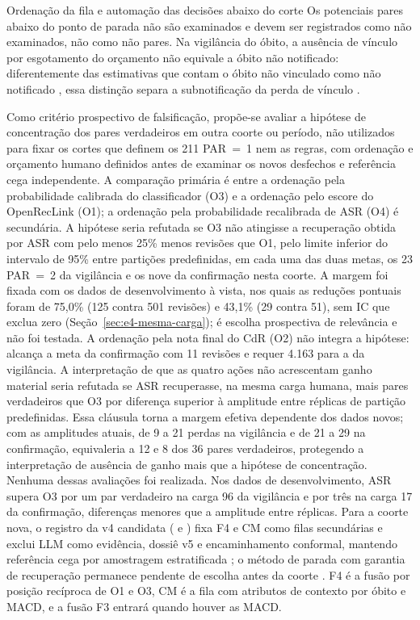 \begin{chapter}{Ordenação da fila e automação das decisões abaixo do corte}
Os potenciais pares abaixo do ponto de parada não são examinados e devem ser registrados como não examinados, não como não pares. Na vigilância do óbito, a ausência de vínculo por esgotamento do orçamento não equivale a óbito não notificado: diferentemente das estimativas que contam o óbito não vinculado como não notificado \cite{Oliveira2012uso,Pinheiro2012subnotificacao}, essa distinção separa a subnotificação da perda de vínculo \cite{Doidge2019linkageerror}.

Como critério prospectivo de falsificação, propõe-se avaliar a hipótese de concentração dos pares verdadeiros em outra coorte ou período, não utilizados para fixar os cortes que definem os 211 PAR~=~1 nem as regras, com ordenação e orçamento humano definidos antes de examinar os novos desfechos e referência cega independente. A comparação primária é entre a ordenação pela probabilidade calibrada do classificador (O3) e a ordenação pelo escore do OpenRecLink (O1); a ordenação pela probabilidade recalibrada de ASR (O4) é secundária. A hipótese seria refutada se O3 não atingisse a recuperação obtida por ASR com pelo menos 25\% menos revisões que O1, pelo limite inferior do intervalo de 95\% entre partições predefinidas, em cada uma das duas metas, os 23 PAR~=~2 da vigilância e os nove da confirmação nesta coorte. A margem foi fixada com os dados de desenvolvimento à vista, nos quais as reduções pontuais foram de 75,0\% (125 contra 501 revisões) e 43,1\% (29 contra 51), sem IC que exclua zero (Seção~\ref{sec:e4-mesma-carga}); é escolha prospectiva de relevância e não foi testada. A ordenação pela nota final do CdR (O2) não integra a hipótese: alcança a meta da confirmação com 11 revisões e requer 4.163 para a da vigilância. A interpretação de que as quatro ações não acrescentam ganho material seria refutada se ASR recuperasse, na mesma carga humana, mais pares verdadeiros que O3 por diferença superior à amplitude entre réplicas de partição predefinidas. Essa cláusula torna a margem efetiva dependente dos dados novos; com as amplitudes atuais, de 9 a 21 perdas na vigilância e de 21 a 29 na confirmação, equivaleria a 12 e 8 dos 36 pares verdadeiros, protegendo a interpretação de ausência de ganho mais que a hipótese de concentração. Nenhuma dessas avaliações foi realizada. Nos dados de desenvolvimento, ASR supera O3 por um par verdadeiro na carga 96 da vigilância e por três na carga 17 da confirmação, diferenças menores que a amplitude entre réplicas. Para a coorte nova, o registro da v4 candidata ( e ) fixa F4 e CM como filas secundárias e exclui LLM como evidência, dossiê v5 e encaminhamento conformal, mantendo referência cega por amostragem estratificada \cite{Lam2026clerical}; o método de parada com garantia de recuperação permanece pendente de escolha antes da coorte \cite{Callaghan2020stopping,Lewis2021certifying,DiNunzio2026stopping}. F4 é a fusão por posição recíproca de O1 e O3, CM é a fila com atributos de contexto por óbito e MACD, e a fusão F3 entrará quando houver as MACD.


\end{chapter}
